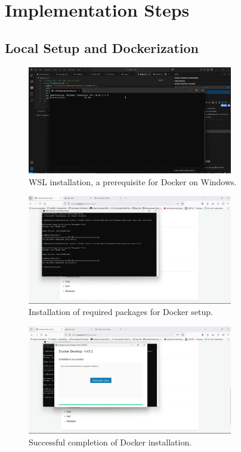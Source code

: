 \documentclass[a4paper,12pt]{article}
\begin{document}
\section{Implementation Steps}

\subsection{Local Setup and Dockerization}
\begin{figure}[h]
    \centering
    \includegraphics[width=0.8\textwidth]{WSL installation.jpg}
    \caption{WSL installation, a prerequisite for Docker on Windows.}
\end{figure}
\begin{figure}[h]
    \centering
    \includegraphics[width=0.8\textwidth]{Docker_installation_requirement_package.jpg}
    \caption{Installation of required packages for Docker setup.}
\end{figure}
\begin{figure}[h]
    \centering
    \includegraphics[width=0.8\textwidth]{Docker_installation.jpg}
    \caption{Successful completion of Docker installation.}
\end{figure}
\end{document}
